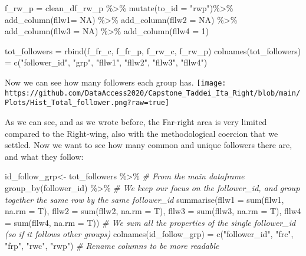 \documentclass[
]{article}
\newenvironment{Shaded}{\begin{snugshade}}{\end{snugshade}}
\newcommand{\AttributeTok}[1]{\textcolor[rgb]{0.77,0.63,0.00}{#1}}
\newcommand{\CommentTok}[1]{\textcolor[rgb]{0.56,0.35,0.01}{\textit{#1}}}
\newcommand{\ConstantTok}[1]{\textcolor[rgb]{0.00,0.00,0.00}{#1}}
\newcommand{\DecValTok}[1]{\textcolor[rgb]{0.00,0.00,0.81}{#1}}
\newcommand{\FunctionTok}[1]{\textcolor[rgb]{0.00,0.00,0.00}{#1}}
\newcommand{\NormalTok}[1]{#1}
\newcommand{\OtherTok}[1]{\textcolor[rgb]{0.56,0.35,0.01}{#1}}
\newcommand{\SpecialCharTok}[1]{\textcolor[rgb]{0.00,0.00,0.00}{#1}}
\newcommand{\StringTok}[1]{\textcolor[rgb]{0.31,0.60,0.02}{#1}}
\begin{document}
\begin{Shaded}
\begin{Highlighting}[]
\NormalTok{f\_rw\_p }\OtherTok{=}\NormalTok{ clean\_df\_rw\_p }\SpecialCharTok{\%\textgreater{}\%} 
  \FunctionTok{mutate}\NormalTok{(}\AttributeTok{to\_id =} \StringTok{"rwp"}\NormalTok{)}\SpecialCharTok{\%\textgreater{}\%} 
  \FunctionTok{add\_column}\NormalTok{(}\AttributeTok{fllw1=} \ConstantTok{NA}\NormalTok{) }\SpecialCharTok{\%\textgreater{}\%} 
  \FunctionTok{add\_column}\NormalTok{(}\AttributeTok{fllw2 =} \ConstantTok{NA}\NormalTok{) }\SpecialCharTok{\%\textgreater{}\%} 
  \FunctionTok{add\_column}\NormalTok{(}\AttributeTok{fllw3 =} \ConstantTok{NA}\NormalTok{) }\SpecialCharTok{\%\textgreater{}\%} 
  \FunctionTok{add\_column}\NormalTok{(}\AttributeTok{fllw4 =} \DecValTok{1}\NormalTok{)}

\NormalTok{tot\_followers }\OtherTok{=} \FunctionTok{rbind}\NormalTok{(f\_fr\_c, f\_fr\_p, f\_rw\_c, f\_rw\_p)}
\FunctionTok{colnames}\NormalTok{(tot\_followers) }\OtherTok{=} \FunctionTok{c}\NormalTok{(}\StringTok{"follower\_id"}\NormalTok{, }\StringTok{"grp"}\NormalTok{, }\StringTok{"fllw1"}\NormalTok{, }\StringTok{"fllw2"}\NormalTok{, }\StringTok{"fllw3"}\NormalTok{, }\StringTok{"fllw4"}\NormalTok{)}
\end{Highlighting}
\end{Shaded}

Now we can see how many followers each group has.
\texttt{[image: https://github.com/DataAccess2020/Capstone\_Taddei\_Ita\_Right/blob/main/Plots/Hist\_Total\_follower.png?raw=true]}

As we can see, and as we wrote before, the Far-right area is very
limited compared to the Right-wing, also with the methodological
coercion that we settled. Now we want to see how many common and unique
followers there are, and what they follow:

\begin{Shaded}
\begin{Highlighting}[]
\NormalTok{id\_follow\_grp}\OtherTok{\textless{}{-}}\NormalTok{ tot\_followers }\SpecialCharTok{\%\textgreater{}\%}  \CommentTok{\# From the main dataframe}
  \FunctionTok{group\_by}\NormalTok{(follower\_id) }\SpecialCharTok{\%\textgreater{}\%}  \CommentTok{\# We keep our focus on the follower\_id, and group together the same row by the same follower\_id}
  \FunctionTok{summarise}\NormalTok{(}\AttributeTok{fllw1 =} \FunctionTok{sum}\NormalTok{(fllw1, }\AttributeTok{na.rm =}\NormalTok{ T),}
            \AttributeTok{fllw2 =} \FunctionTok{sum}\NormalTok{(fllw2, }\AttributeTok{na.rm =}\NormalTok{ T),}
            \AttributeTok{fllw3 =} \FunctionTok{sum}\NormalTok{(fllw3, }\AttributeTok{na.rm =}\NormalTok{ T),}
            \AttributeTok{fllw4 =} \FunctionTok{sum}\NormalTok{(fllw4, }\AttributeTok{na.rm =}\NormalTok{ T)) }\CommentTok{\# We sum all the properties of the single follower\_id (so if it follows other groups)}
\FunctionTok{colnames}\NormalTok{(id\_follow\_grp) }\OtherTok{=} \FunctionTok{c}\NormalTok{(}\StringTok{"follower\_id"}\NormalTok{, }\StringTok{"frc"}\NormalTok{, }\StringTok{"frp"}\NormalTok{, }\StringTok{"rwc"}\NormalTok{, }\StringTok{"rwp"}\NormalTok{) }\CommentTok{\# Rename columns to be more readable}
\end{Highlighting}
\end{Shaded}
\end{document}
